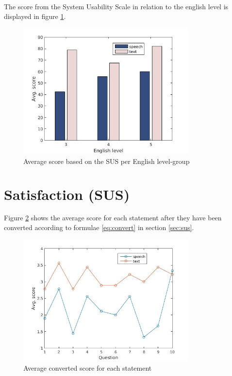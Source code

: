 The score from the System Usability Scale in relation to the english level is displayed in figure \ref{eng_score}.
\begin{figure}[ht]
  \centering
  \includegraphics[width=0.8\textwidth]{images/english_score.jpg}
  \caption{Average score based on the SUS per English level-group}\label{eng_score}
\end{figure}


\section{Satisfaction (SUS)}
Figure \ref{fig:sus_table} shows the average score for each statement after they have been converted according to formulae \ref{eq:convert} in section \ref{sec:sus}. 
\begin{figure}[ht]
  \centering
  \includegraphics[width=0.8\textwidth]{images/sus.jpg}
  \caption{Average converted score for each statement}\label{fig:sus_table}
\end{figure}

